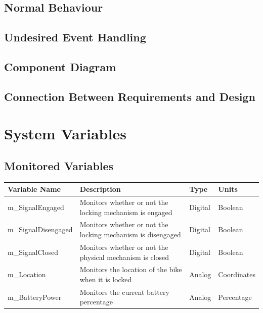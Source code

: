 \documentclass[12pt, titlepage]{article}
\begin{document}
\subsection{Normal Behaviour}

\subsection{Undesired Event Handling}


\subsection{Component Diagram}

\subsection{Connection Between Requirements and Design} \label{SecConnection}


\newpage
\section{System Variables}


\subsection{Monitored Variables}

\begin{minipage}{\textwidth}
\renewcommand*{\arraystretch}{1.5}
\begin{tabular}{| p{} | p{} | p{} | p{} |}
 \hline
 Variable Name & Description & Type & Units \\ 
 \hline
 m\_SignalEngaged & Monitors whether or not the locking mechanism is engaged & Digital & Boolean \\ 
  \hline
 m\_SignalDisengaged & Monitors whether or not the locking mechanism is disengaged & Digital & Boolean \\ 
  \hline
 m\_SignalClosed& Monitors whether or not the physical mechanism is closed & Digital & Boolean \\ 
  \hline
 m\_Location & Monitors the location of the bike when it is locked & Analog & Coordinates \\ 
  \hline
 m\_BatteryPower & Monitors the current battery percentage & Analog & Percentage \\ 
 \hline
\end{tabular}
\end{minipage}\\
\end{document}
